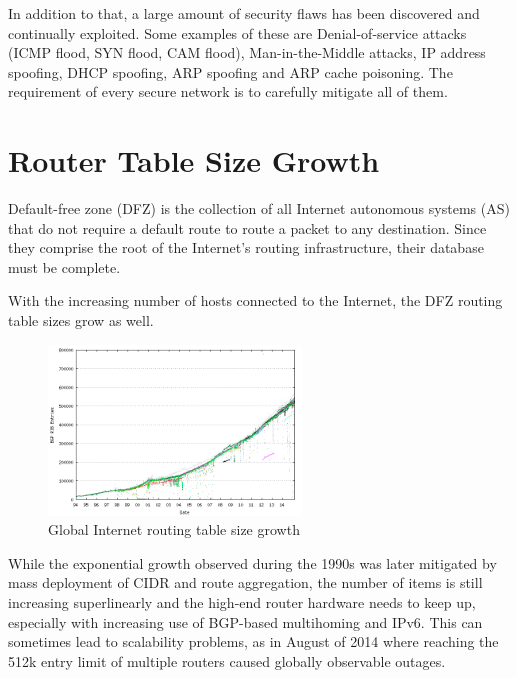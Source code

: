         In addition to that, a large amount of security flaws has been discovered and continually exploited. Some examples of these are Denial-of-service attacks (ICMP flood, SYN flood, CAM flood), Man-in-the-Middle attacks, IP address spoofing, DHCP spoofing, ARP spoofing and ARP cache poisoning. The requirement of every secure network is to carefully mitigate all of them.

    \section{Router Table Size Growth}
        Default-free zone (DFZ) is the collection of all Internet autonomous systems (AS) that do not require a default route to route a packet to any destination. Since they comprise the root of the Internet's routing infrastructure, their database must be complete.

        With the increasing number of hosts connected to the Internet, the DFZ routing table sizes grow as well.

        \begin{figure}[H]
            \begin{center}
                \includegraphics[width=0.6\textwidth]{fig/bgp-active.png}
              \caption{Global Internet routing table size growth}
              \label{bgp-growth}
            \end{center}
        \end{figure}


        While the exponential growth observed during the 1990s was later mitigated by mass deployment of CIDR and route aggregation, the number of items is still increasing superlinearly and the high-end router hardware needs to keep up, especially with increasing use of BGP-based multihoming and IPv6. This can sometimes lead to scalability problems, as in August of 2014 where reaching the 512k entry limit of multiple routers caused globally observable outages.

